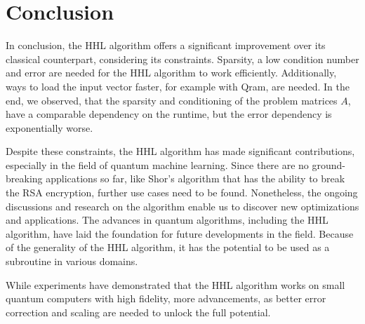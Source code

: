 
\section{Conclusion}

In conclusion, the HHL algorithm offers a significant improvement over its classical counterpart, considering its constraints.
Sparsity, a low condition number and error are needed for the HHL algorithm to work efficiently.
Additionally, ways to load the input vector faster, for example with Qram, are needed. 
In the end, we observed, that the sparsity and conditioning of the problem matrices $A$, have a comparable dependency on the runtime, but the error dependency is exponentially worse. 

Despite these constraints, the HHL algorithm has made significant contributions, especially in the field of quantum machine learning. 
Since there are no ground-breaking applications so far, like Shor's algorithm that has the ability to break the RSA encryption, further use cases need to be found.
Nonetheless, the ongoing discussions and research on the algorithm enable us to discover new optimizations and applications.
The advances in quantum algorithms, including the HHL algorithm, have laid the foundation for future developments in the field.
Because of the generality of the HHL algorithm, it has the potential to be used as a subroutine in various domains.

While experiments have demonstrated that the HHL algorithm works on small quantum computers with high fidelity, 
more advancements, as better error correction and scaling are needed to unlock the full potential.



